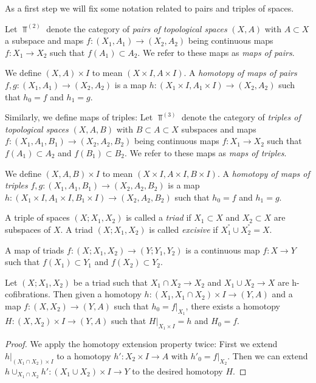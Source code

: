 As a first step we will fix some notation related to pairs and triples of spaces. 
\begin{definition}
    Let $\Top^{(2)}$ denote the category of \emph{pairs of topological spaces} $(X,A)$ with $A\subset X$ a subspace and maps $f\colon(X_1,A_1)\to (X_2,A_2)$ being continuous maps $f\colon X_1\to X_2$ such that $f(A_1)\subset A_2$.
    We refer to these maps as \emph{maps of pairs}.
    
    We define $(X,A)\times I$ to mean $(X\times I,A\times I)$.
    A \emph{homotopy of maps of pairs} $f,g\colon(X_1,A_1)\to (X_2,A_2)$ is a map $h\colon(X_1\times I,A_1\times I)\to (X_2,A_2)$ such that $h_0=f$ and $h_1=g$.

    Similarly, we define maps of triples:
    Let $\Top^{(3)}$ denote the category of \emph{triples of topological spaces} $(X,A,B)$ with $B\subset A\subset X$ subspaces and maps $f\colon(X_1,A_1,B_1)\to (X_2,A_2,B_2)$ being continuous maps $f\colon X_1\to X_2$ such that $f(A_1)\subset A_2$ and $f(B_1)\subset B_2$.
    We refer to these maps as \emph{maps of triples}.
    
    We define $(X,A,B)\times I$ to mean $(X\times I,A\times I, B\times I)$.
    A \emph{homotopy of maps of triples} $f,g\colon(X_1,A_1,B_1)\to (X_2,A_2,B_2)$ is a map $h\colon(X_1\times I,A_1\times I,B_1\times I)\to (X_2,A_2,B_2)$ such that $h_0=f$ and $h_1=g$.
\end{definition}
\begin{definition}[Triad]
    A triple of spaces $(X;X_1,X_2)$ is called a \emph{triad} if $X_1\subset X$ and $X_2\subset X$ are subspaces of $X$.
    A triad $(X;X_1,X_2)$ is called \emph{excisive} if $X_1^°\cup X_2^°=X$.

    A map of triads $f\colon (X;X_1,X_2)\to (Y;Y_1,Y_2)$ is a continuous map $f\colon X\to Y$ such that $f(X_1)\subset Y_1$ and $f(X_2)\subset Y_2$.
\end{definition}
\begin{lemma}\label{lem:rHEP}
    Let $(X;X_1,X_2)$ be a triad such that $X_1\cap X_2\to X_2$ and $X_1\cup X_2\to X$ are h-cofibrations. 
    Then given a homotopy $h\colon(X_1,X_1\cap X_2)\times I\to(Y,A)$ and a map $f\colon(X,X_2)\to(Y,A)$ such that $h_0=f|_{X_1}$, there exists a homotopy $H\colon(X,X_2)\times I\to(Y,A)$ such that $H|_{X_1\times I}=h$ and $H_0=f$.
    \begin{proof}
        We apply the homotopy extension property twice: First we extend $h|_{\left(X_1\cap X_2\right)\times I}$ to a homotopy $h'\colon X_2\times I\to A$ with $h'_0=f|_{X_2}$.
        Then we can extend $h\cup_{X_1\cap X_2} h'\colon \left(X_1\cup X_2\right)\times I\to Y$ to the desired homotopy $H$.
    \end{proof}
\end{lemma}
